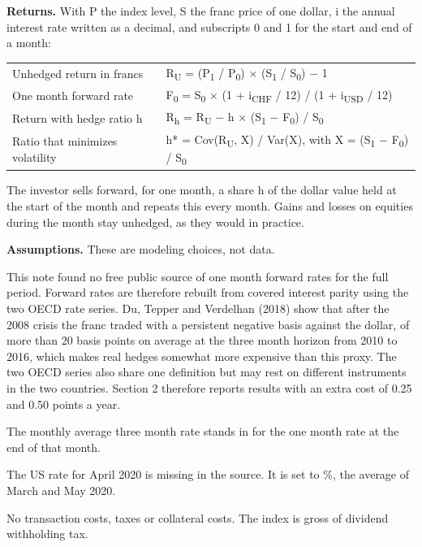 \documentclass[a4paper,fontsize=10.2pt,parskip=half-]{scrartcl}
\newcommand{\lead}[1]{\textbf{#1}}
\begin{document}
\lead{Returns.} With P the index level, S the franc price of one dollar, i the annual interest rate written as a decimal, and subscripts 0 and 1 for the start and end of a month:

{\sffamily\small
\begin{tabular}{@{}ll@{}}
Unhedged return in francs & R\textsubscript{U} = (P\textsubscript{1} / P\textsubscript{0}) × (S\textsubscript{1} / S\textsubscript{0}) − 1 \\
One month forward rate & F\textsubscript{0} = S\textsubscript{0} × (1 + i\textsubscript{CHF} / 12) / (1 + i\textsubscript{USD} / 12) \\
Return with hedge ratio h & R\textsubscript{h} = R\textsubscript{U} − h × (S\textsubscript{1} − F\textsubscript{0}) / S\textsubscript{0} \\
Ratio that minimizes volatility & h* = Cov(R\textsubscript{U}, X) / Var(X), with X = (S\textsubscript{1} − F\textsubscript{0}) / S\textsubscript{0} \\
\end{tabular}}

The investor sells forward, for one month, a share h of the dollar value held at the start of the month and repeats this every month. Gains and losses on equities during the month stay unhedged, as they would in practice.

\lead{Assumptions.} These are modeling choices, not data.

\begin{assume}
\item[\textbf{A1}] This note found no free public source of one month forward rates for the full period. Forward rates are therefore rebuilt from covered interest parity using the two OECD rate series. Du, Tepper and Verdelhan (2018) show that after the 2008 crisis the franc traded with a persistent negative basis against the dollar, of more than 20 basis points on average at the three month horizon from 2010 to 2016, which makes real hedges somewhat more expensive than this proxy. The two OECD series also share one definition but may rest on different instruments in the two countries. Section 2 therefore reports results with an extra cost of 0.25 and 0.50 points a year.
\item[\textbf{A2}] The monthly average three month rate stands in for the one month rate at the end of that month.
\item[\textbf{A3}] The US rate for April 2020 is missing in the source. It is set to \FillRate\%, the average of March and May 2020.
\item[\textbf{A4}] No transaction costs, taxes or collateral costs. The index is gross of dividend withholding tax.
\end{assume}
\end{document}
